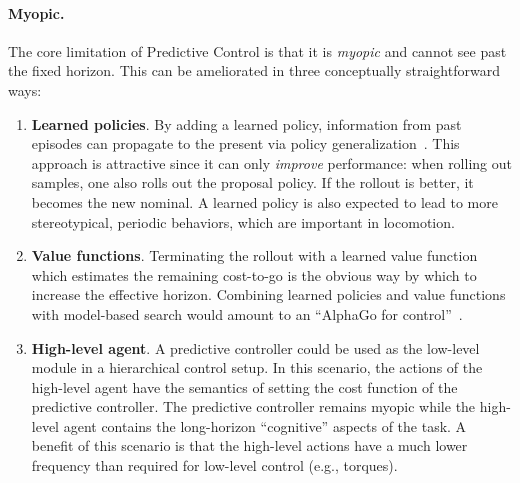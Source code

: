 \paragraph{Myopic.} The core limitation of Predictive Control is that it is \emph{myopic} and cannot see past the fixed horizon. This can be ameliorated in three conceptually straightforward ways:
\begin{enumerate}
	\item \textbf{Learned policies}. By adding a learned policy, information from past episodes can propagate to the present via policy generalization~\cite{byravan2021evaluating}. This approach is attractive since it can only \emph{improve} performance: when rolling out samples, one also rolls out the proposal policy. If the rollout is better, it becomes the new nominal. A learned policy is also expected to lead to more stereotypical, periodic behaviors, which are important in locomotion. 
	\item \textbf{Value functions}. Terminating the rollout with a learned value function which estimates the remaining cost-to-go is the obvious way by which to increase the effective horizon. Combining learned policies and value functions with model-based search would amount to an ``AlphaGo for control''~\cite{silver2016mastering, springenberg2020local}.
	\item \textbf{High-level agent}. A predictive controller could be used as the low-level module in a hierarchical control setup. In this scenario, the actions of the high-level agent have the semantics of setting the cost function of the predictive controller. The predictive controller remains myopic while the high-level agent contains the long-horizon ``cognitive'' aspects of the task. A benefit of this scenario is that the high-level actions have a much lower frequency than required for low-level control (e.g., torques).
\end{enumerate}


